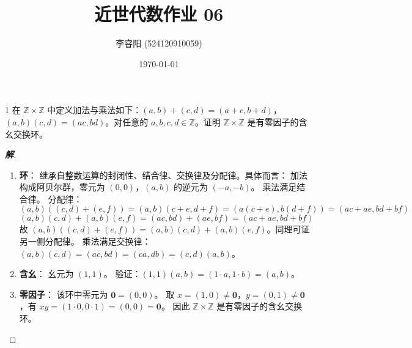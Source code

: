 \documentclass[12pt, a4paper]{article}
\title{近世代数作业 06}
\author{李睿阳 (524120910059)}
\date{\today}
\newenvironment{solution}{
    \begin{proof}[\textbf{解}]
}{
    \end{proof}
}
\begin{document}
\maketitle


\begin{problem}{1}
    在 $\mathbb{Z} \times \mathbb{Z}$ 中定义加法与乘法如下：$(a,b)+(c,d)=(a+c,b+d)$，$(a,b)(c,d)=(ac,bd)$。对任意的 $a,b,c,d \in \mathbb{Z}$。证明 $\mathbb{Z} \times \mathbb{Z}$ 是有零因子的含幺交换环。
\end{problem}
\begin{solution}
    \begin{enumerate}[1.]
        \item \textbf{环}：
        继承自整数运算的封闭性、结合律、交换律及分配律。具体而言：
        加法构成阿贝尔群，零元为 $(0,0)$，$(a,b)$ 的逆元为 $(-a,-b)$。
        乘法满足结合律。
        分配律：
        \[ (a,b)((c,d)+(e,f))=(a,b)(c+e,d+f)=(a(c+e),b(d+f))=(ac+ae,bd+bf) \]
        \[ (a,b)(c,d)+(a,b)(e,f)=(ac,bd)+(ae,bf)=(ac+ae,bd+bf) \]
        故 $(a,b)((c,d)+(e,f))=(a,b)(c,d)+(a,b)(e,f)$。同理可证另一侧分配律。
        乘法满足交换律：$(a,b)(c,d)=(ac,bd)=(ca,db)=(c,d)(a,b)$。

        \item \textbf{含幺}：
        幺元为 $(1,1)$。
        验证：$(1,1)(a,b)=(1 \cdot a, 1 \cdot b)=(a,b)$。

        \item \textbf{零因子}：
        该环中零元为 $\mathbf{0}=(0,0)$。
        取 $x=(1,0) \neq \mathbf{0}$，$y=(0,1) \neq \mathbf{0}$，有 $xy=(1\cdot 0, 0\cdot 1)=(0,0)=\mathbf{0}$。
        因此 $\mathbb{Z} \times \mathbb{Z}$ 是有零因子的含幺交换环。
    \end{enumerate}
\end{solution}
\end{document}
